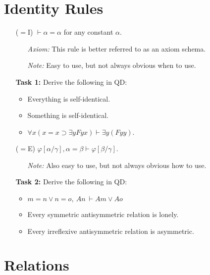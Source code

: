\documentclass[a4paper, 11pt]{article} %
\newcommand{\unisub}[2]{[#1/#2]}
\begin{document}
\section*{Identity Rules}

\begin{enumerate}
  \item[($=$I)] $\vdash \alpha = \alpha$ for any constant $\alpha$. 
    \begin{itemize}
      \item[\it Axiom:] This rule is better referred to as an axiom schema.
      \item[\it Note:] Easy to use, but not always obvious when to use.
    \end{itemize}
  \item[\bf Task 1:] Derive the following in QD:
    \begin{itemize}
      \item Everything is self-identical.
      \item Something is self-identical.
      \item $\forall x(x=x \supset \exists yFyx) \vdash \exists y(Fyy)$.
    \end{itemize}
  \item[($=$E)] $\varphi\unisub{\alpha}{\gamma},\alpha=\beta\vdash\varphi\unisub{\beta}{\gamma}$.
    \begin{itemize}
      \item[\it Note:] Also easy to use, but not always obvious how to use.
    \end{itemize}
  \item[\bf Task 2:] Derive the following in QD:
    \begin{itemize}
      \item $m = n \vee n = o,\ An\ \vdash Am \vee Ao$
      \item Every symmetric antisymmetric relation is lonely.
      \item Every irreflexive antisymmetric relation is asymmetric.
    \end{itemize}
\end{enumerate}






\section*{Relations}
\end{document}
